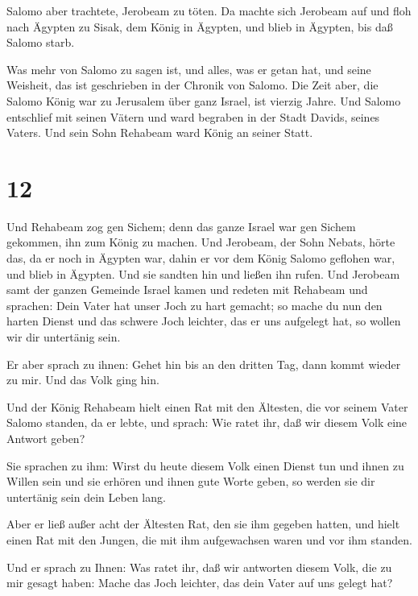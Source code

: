  Salomo aber trachtete, Jerobeam zu töten. Da machte sich
Jerobeam auf und floh nach Ägypten zu Sisak, dem König in Ägypten, und
blieb in Ägypten, bis daß Salomo starb.

 Was mehr von Salomo zu sagen ist, und alles, was er getan
hat, und seine Weisheit, das ist geschrieben in der Chronik von Salomo.
 Die Zeit aber, die Salomo König war zu Jerusalem über ganz
Israel, ist vierzig Jahre.  Und Salomo entschlief mit
seinen Vätern und ward begraben in der Stadt Davids, seines Vaters. Und
sein Sohn Rehabeam ward König an seiner Statt.

\hypertarget{section-11}{%
\section{12}\label{section-11}}

 Und Rehabeam zog gen Sichem; denn das ganze Israel war gen
Sichem gekommen, ihn zum König zu machen.  Und Jerobeam, der
Sohn Nebats, hörte das, da er noch in Ägypten war, dahin er vor dem
König Salomo geflohen war, und blieb in Ägypten.  Und sie
sandten hin und ließen ihn rufen. Und Jerobeam samt der ganzen Gemeinde
Israel kamen und redeten mit Rehabeam und sprachen:  Dein
Vater hat unser Joch zu hart gemacht; so mache du nun den harten Dienst
und das schwere Joch leichter, das er uns aufgelegt hat, so wollen wir
dir untertänig sein.

 Er aber sprach zu ihnen: Gehet hin bis an den dritten Tag,
dann kommt wieder zu mir. Und das Volk ging hin.

 Und der König Rehabeam hielt einen Rat mit den Ältesten,
die vor seinem Vater Salomo standen, da er lebte, und sprach: Wie ratet
ihr, daß wir diesem Volk eine Antwort geben?

 Sie sprachen zu ihm: Wirst du heute diesem Volk einen
Dienst tun und ihnen zu Willen sein und sie erhören und ihnen gute Worte
geben, so werden sie dir untertänig sein dein Leben lang.

 Aber er ließ außer acht der Ältesten Rat, den sie ihm
gegeben hatten, und hielt einen Rat mit den Jungen, die mit ihm
aufgewachsen waren und vor ihm standen.

 Und er sprach zu Ihnen: Was ratet ihr, daß wir antworten
diesem Volk, die zu mir gesagt haben: Mache das Joch leichter, das dein
Vater auf uns gelegt hat?

